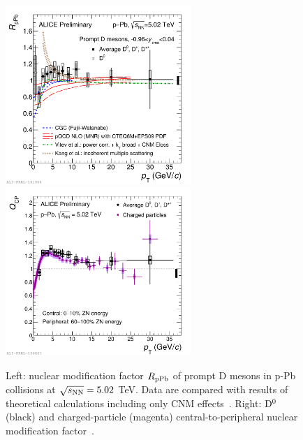 \begin{figure}[!ht]
  \centering
    \includegraphics[width=7cm]{FigCap2/2017-Jul-05-pPbWithModelsCNM.pdf}
    \includegraphics[width=7cm]{FigCap2/2017-Sep-12-QCP-Daverage-ChargedHadrons.pdf}
  \caption{Left: nuclear modification factor $R_{\rm pPb}$ of prompt D mesons in p-Pb collisions at $\sqrt{s_{\rm NN}} = 5.02$ TeV. Data are compared with results of theoretical calculations including only CNM effects~\cite{Fujii:2017rqa,Cacciari:2012ny,Eskola:2016oht,Sharma:2009hn,Kang:2014hha}. Right: ${\rm D^0}$ (black) and charged-particle (magenta) central-to-peripheral nuclear modification factor~\cite{ALICEPAS2017008}.}
  \label{fig:RpA}
\end{figure}


